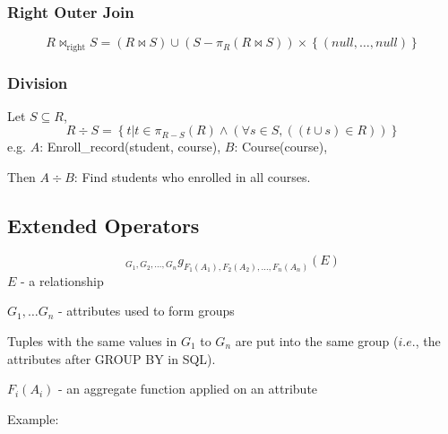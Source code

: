 \documentclass[11pt,a4paper]{article}
\begin{document}
\subsubsection{Right Outer Join}
\[
R \bowtie_{\text{right}} S = (R \bowtie S) \cup (S - \pi_R(R \bowtie S)) \times \left\{(null, \dots, null) \right\}
\]

\subsubsection{Division}
Let $S \subseteq R$,
\[
R \div S = \left\{t | t \in \pi_{R-S}(R) \land (\forall s \in S, ((t \cup s) \in R)) \right\}
\]
e.g. $A$: Enroll\_record(student, course), $B$: Course(course), \par
\quad Then $A \div B$: Find students who enrolled in all courses.

\subsection{Extended Operators}
\[
{}_{G_1, G_2, \dots, G_n} g_{F_1(A_1), F_2(A_2), \dots, F_n(A_n)}(E)
\]
\textbf{$E$} - a relationship \par
    
\textbf{$G_1, \dots G_n$} - attributes used to form groups \par
Tuples with the same values in $G_1$ to $G_n$ are put into the same group ($i.e.$, the attributes after GROUP BY in SQL). \par

\textbf{$F_i(A_i)$} - an aggregate function applied on an attribute 

Example: 
\end{document}
